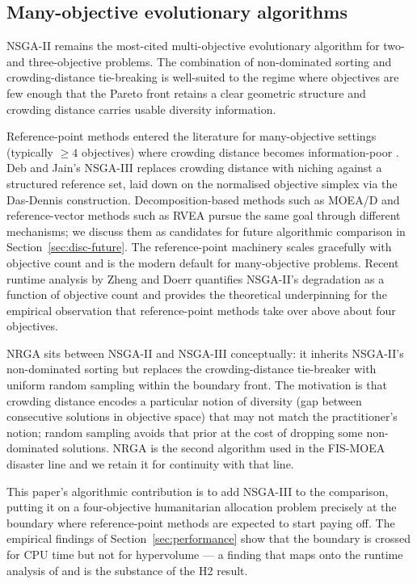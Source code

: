 \documentclass[applsci,article,submit,moreauthors,pdftex]{Definitions/mdpi}
\begin{document}
\subsection{Many-objective evolutionary algorithms}\label{sec:related-moea}

NSGA-II \cite{deb2002} remains the most-cited multi-objective evolutionary
algorithm for two- and three-objective problems. The combination of
non-dominated sorting and crowding-distance tie-breaking is well-suited to
the regime where objectives are few enough that the Pareto front retains a
clear geometric structure and crowding distance carries usable diversity
information.

Reference-point methods entered the literature for many-objective settings
(typically $\ge 4$ objectives) where crowding distance becomes
information-poor \cite{ishibuchi2008, li2015many, coello2007}. Deb and
Jain's NSGA-III \cite{deb2014nsga3} replaces crowding distance with
niching against a structured reference set, laid down on the normalised
objective simplex via the Das-Dennis construction. Decomposition-based
methods such as MOEA/D \cite{zhang2007moead} and reference-vector
methods such as RVEA \cite{cheng2016rvea} pursue the same goal through
different mechanisms; we discuss them as candidates for future
algorithmic comparison in Section~\ref{sec:disc-future}. The
reference-point machinery scales gracefully with objective count and
is the modern default for many-objective problems. Recent runtime
analysis by Zheng and Doerr \cite{zheng2024nsga2} quantifies NSGA-II's
degradation as a function of objective count and provides the
theoretical underpinning for the empirical observation that
reference-point methods take over above about four objectives.

NRGA \cite{omar2008nrga} sits between NSGA-II and NSGA-III conceptually:
it inherits NSGA-II's non-dominated sorting but replaces the
crowding-distance tie-breaker with uniform random sampling within the
boundary front. The motivation is that crowding distance encodes a
particular notion of diversity (gap between consecutive solutions in
objective space) that may not match the practitioner's notion; random
sampling avoids that prior at the cost of dropping some non-dominated
solutions. NRGA is the second algorithm used in the FIS-MOEA disaster
line \cite{rabiei2021, rabiei2023} and we retain it for
continuity with that line.

This paper's algorithmic contribution is to add NSGA-III
to the comparison, putting it on a four-objective humanitarian allocation
problem precisely at the boundary where reference-point methods are
expected to start paying off. The empirical findings of
Section~\ref{sec:performance} show that the boundary is crossed for CPU
time but not for hypervolume --- a finding that maps onto the runtime
analysis of \cite{zheng2024nsga2} and is the substance of the H2 result.
\end{document}
